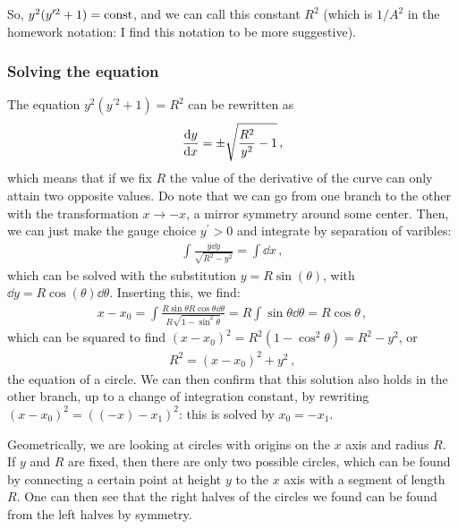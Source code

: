 \documentclass[main.tex]{subfiles}
\begin{document}
So, \(y^2 (y^{\prime 2} + 1) = \text{const}\), and we can call this constant \(R^2\) (which is \(1/A^2\) in the homework notation: I find this notation to be more suggestive).

\subsubsection{Solving the equation}

The equation \(y^2 (y^{\prime 2}+1) = R^2\) can be rewritten as 
%
\begin{align}
  \dv{y}{x} = \pm \sqrt{\frac{R^2}{y^2} - 1}
\,,
\end{align}
%
which means that if we fix \(R\) the value of the derivative of the curve can only attain two opposite values. Do note that we can go from one branch to the other with the transformation \(x \rightarrow -x\), a mirror symmetry around some center.
Then, we can just make the gauge choice \(y^{\prime }>0\) and integrate by separation of varibles: 
%
\begin{align}
  \int \frac{y \dd{y}}{\sqrt{R^2-y^2}} = \int \dd{x}
\,,
\end{align}
%
which can be solved with the substitution \( y = R \sin(\theta )\), with \(\dd{y} = R \cos(\theta ) \dd{\theta }\). Inserting this, we find: 
%
\begin{align}
  x - x_0  = \int \frac{R \sin\theta R \cos\theta  \dd{\theta }}{R \sqrt{1 - \sin^2 \theta }} 
  = R \int \sin \theta  \dd{\theta } = R \cos \theta 
\,,
\end{align}
%
which can be squared to find \((x- x_0 )^2 = R^2 (1 - \cos^2 \theta ) = R^2 - y^2\), or 
%
\begin{align}
  R^2 = (x-x_0  )^2 + y^2
\,,
\end{align}
%
the equation of a circle.
We can then confirm that this solution also holds in the other branch, up to a change of integration constant, by rewriting \((x- x_0 )^2 = ((-x) - x_1 )^2\): this is solved by \(x_0 = - x_1 \). 

Geometrically, we are looking at circles with origins on the \(x\) axis and radius \(R\). If \(y\) and \(R\) are fixed, then there are only two possible circles, which can be found by connecting a certain point at height \(y\) to the \(x\) axis with a segment of length \(R\).
One can then see that the right halves of the circles we found can be found from the left halves by symmetry.
\end{document}
